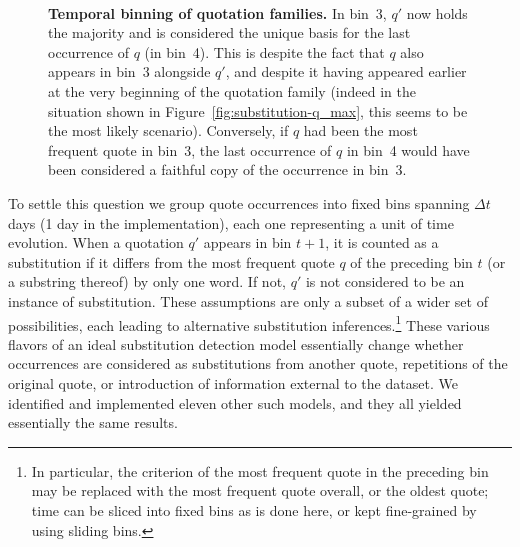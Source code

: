 \begin{figure}[h]
    \centering
	\hfill \\
	\caption{{\bf Temporal binning of quotation families.} In bin~3, $q'$ now holds the majority and is considered the unique basis for the last occurrence of $q$ (in bin~4). This is despite the fact that $q$ also appears in bin~3 alongside $q'$, and despite it having appeared earlier at the very beginning of the quotation family (indeed in the situation shown in Figure~\ref{fig:substitution-q_max}, this seems to be the most likely scenario). Conversely, if $q$ had been the most frequent quote in bin~3, the last occurrence of $q$ in bin~4 would have been considered a faithful copy of the occurrence in bin~3.}
    \label{fig:substitution-temporal-binning}
\end{figure}

To settle this question we group quote occurrences into fixed bins spanning $\Delta t$ days (1 day in the implementation), each one representing a unit of time evolution.
When a quotation $q'$ appears in bin $t+1$, it is counted as a substitution if it differs from the most frequent quote $q$ of the preceding bin $t$ (or a substring thereof) by only one word. If not, $q'$ is not considered to be an instance of substitution.  %
These assumptions are only a subset of a wider set of possibilities, each leading to alternative substitution inferences.\footnote{In particular, the criterion of the most frequent quote in the preceding bin may be replaced with the most frequent quote overall, or the oldest quote; time can be sliced into fixed bins as is done here, or kept fine-grained by using sliding bins.}
These various flavors of an ideal substitution detection model essentially change whether occurrences are considered as substitutions from another quote, repetitions of the original quote, or introduction of information external to the dataset.
We identified and implemented eleven other such models, and they all yielded essentially the same results.

